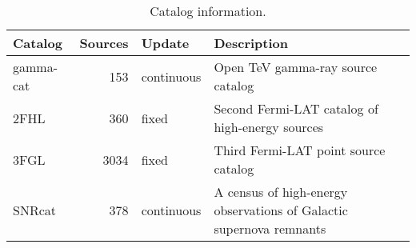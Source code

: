 \begin{table}[tb]

\caption{Catalog information.}
\label{tab:cats}
\begin{tabular}{ lrll }
\hline


Catalog & Sources & Update & Description \\ \hline
gamma-cat & 153 & continuous & Open TeV gamma-ray source catalog\\
2FHL & 360 & fixed & Second Fermi-LAT catalog of high-energy sources\\
3FGL & 3034 & fixed & Third Fermi-LAT point source catalog\\
SNRcat & 378 & continuous & A census of high-energy observations of Galactic supernova remnants\\
\hline
\end{tabular}
\end{table}
